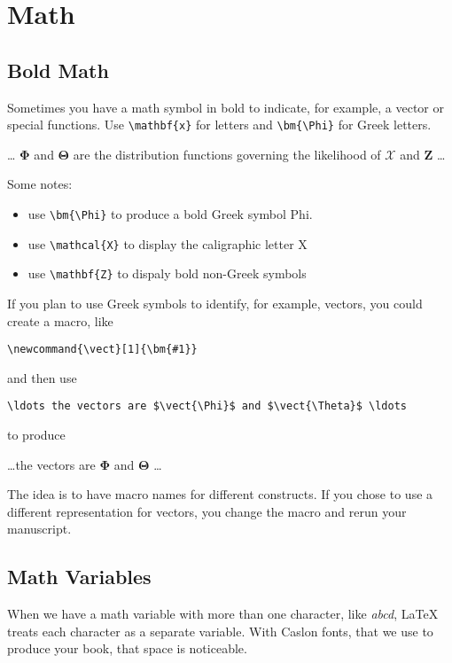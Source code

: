

\chapter{Math}
\label{ch05}

\section{Bold Math}
Sometimes you have a math symbol in bold to indicate, for example,
a vector or special functions. Use \verb+\mathbf{x}+ for letters
and \verb+\bm{\Phi}+ for Greek letters.

\noindent
\ldots
$\bm{\Phi}$ and $\bm{\Theta}$ are the distribution functions
governing the likelihood of $\mathcal{X}$ and $\mathbf{Z}$ \ldots

\blankline
Some notes:
\begin{itemize}
\item
use \verb+\bm{\Phi}+ to produce a bold Greek symbol Phi.
\item
use \verb+\mathcal{X}+ to display the caligraphic letter X
\item
use \verb+\mathbf{Z}+ to dispaly bold non-Greek symbols
\end{itemize}

\blankline
If you plan to use Greek symbols to identify, for example, vectors, you could
create a macro, like

\verb+\newcommand{\vect}[1]{\bm{#1}}+

\newcommand{\vect}[1]{\bm{#1}}

and then use

\noindent
\begin{verbatim}
\ldots the vectors are $\vect{\Phi}$ and $\vect{\Theta}$ \ldots
\end{verbatim}

to produce

\noindent
\ldots the vectors are $\vect{\Phi}$ and $\vect{\Theta}$ \ldots

\blankline
The idea is to have macro names for different constructs.
If you chose to use a different representation for vectors,
you change the macro and rerun your manuscript.


\section{Math Variables}

When we have a math variable with more than one character,
like \textit{abcd}, \LaTeX{} treats each character as a separate variable.
With Caslon fonts, that we use to produce your book, that space is noticeable.

